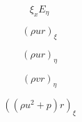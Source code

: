 

$$\xi_x  E_\eta$$

$$(\rho u r)_\xi$$

$$(\rho u r)_\eta$$

$$(\rho v r)_\eta$$

$$((\rho u^2 + p) r)_\xi$$
